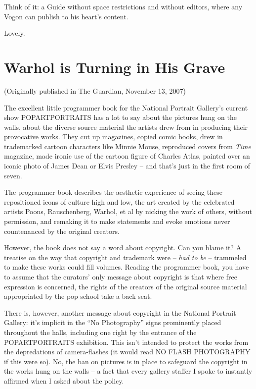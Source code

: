 Think of it: a Guide without space restrictions and without
editors, where any Vogon can publish to his heart's content.

Lovely.

\section{Warhol is Turning in His Grave}

(Originally published in The Guardian, November 13, 2007)

The excellent little programmer book for the National Portrait
Gallery's current show POPARTPORTRAITS has a lot to say about the
pictures hung on the walls, about the diverse source material the
artists drew from in producing their provocative works. They cut up
magazines, copied comic books, drew in trademarked cartoon
characters like Minnie Mouse, reproduced covers from \emph{Time}
magazine, made ironic use of the cartoon figure of Charles Atlas,
painted over an iconic photo of James Dean or Elvis Presley -- and
that's just in the first room of seven.

The programmer book describes the aesthetic experience of seeing
these repositioned icons of culture high and low, the art created
by the celebrated artists Poons, Rauschenberg, Warhol, et al by
nicking the work of others, without permission, and remaking it to
make statements and evoke emotions never countenanced by the
original creators.

However, the book does not say a word about copyright. Can you
blame it? A treatise on the way that copyright and trademark were
-- \emph{had to be} -- trammeled to make these works could fill
volumes. Reading the programmer book, you have to assume that the
curators' only message about copyright is that where free
expression is concerned, the rights of the creators of the original
source material appropriated by the pop school take a back seat.

There is, however, another message about copyright in the National
Portrait Gallery: it's implicit in the ``No Photography'' signs
prominently placed throughout the halls, including one right by the
entrance of the POPARTPORTRAITS exhibition. This isn't intended to
protect the works from the depredations of camera-flashes (it would
read NO FLASH PHOTOGRAPHY if this were so). No, the ban on pictures
is in place to safeguard the copyright in the works hung on the
walls -- a fact that every gallery staffer I spoke to instantly
affirmed when I asked about the policy.


